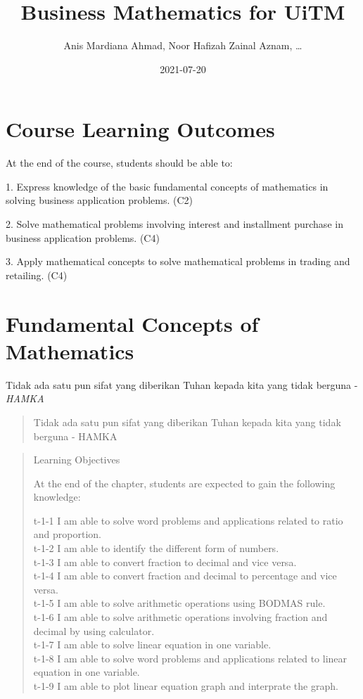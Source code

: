 \documentclass[
]{book}
\title{Business Mathematics for UiTM}
\author{Anis Mardiana Ahmad, Noor Hafizah Zainal Aznam, \ldots{}}
\date{2021-07-20}
\begin{document}
\maketitle

{
\setcounter{tocdepth}{1}
\tableofcontents
}
\hypertarget{course-learning-outcomes}{%
\chapter*{Course Learning Outcomes}\label{course-learning-outcomes}}

At the end of the course, students should be able to:

1. Express knowledge of the basic fundamental concepts of mathematics in solving business application problems. (C2)

2. Solve mathematical problems involving interest and installment purchase in business application problems. (C4)

3. Apply mathematical concepts to solve mathematical problems in trading and retailing. (C4)

\hypertarget{intro}{%
\chapter{Fundamental Concepts of Mathematics}\label{intro}}

\begin{noteblock}
Tidak ada satu pun sifat yang diberikan Tuhan kepada kita yang tidak berguna - \emph{HAMKA}

\end{noteblock}

\begin{quote}
Tidak ada satu pun sifat yang diberikan Tuhan kepada kita yang tidak berguna - HAMKA
\end{quote}

\begin{quote}
Learning Objectives

At the end of the chapter, students are expected to gain the following knowledge:

t-1-1 I am able to solve word problems and applications related to ratio and proportion.\\
t-1-2 I am able to identify the different form of numbers.\\
t-1-3 I am able to convert fraction to decimal and vice versa.\\
t-1-4 I am able to convert fraction and decimal to percentage and vice versa.\\
t-1-5 I am able to solve arithmetic operations using BODMAS rule.\\
t-1-6 I am able to solve arithmetic operations involving fraction and decimal by using calculator.\\
t-1-7 I am able to solve linear equation in one variable.\\
t-1-8 I am able to solve word problems and applications related to linear equation in one variable.\\
t-1-9 I am able to plot linear equation graph and interprate the graph.
\end{quote}
\end{document}
